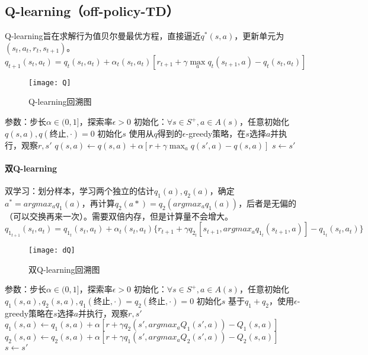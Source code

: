 \documentclass[
12pt, %
a4paper, 
oneside, %
headinclude,footinclude, %
]{scrartcl}
\begin{document}
\subsection[Q-learning]{Q-learning（off-policy-TD）}
Q-learning旨在求解行为值贝尔曼最优方程，直接逼近$ q^*(s, a) $，更新单元为$ (s_t, a_t, r_t, s_{t + 1}) $。
$$ q_{t + 1}(s_t, a_t) = q_t(s_t, a_t) + \alpha_t(s_t, a_t)[r_{t + 1} + \gamma \max_a q_t(s_{t + 1}, a) - q_t(s_t, a_t)] $$

\begin{figure}[H]
\centering
\texttt{[image: Q]}
\caption[Q-learning回溯图]{Q-learning回溯图}
\end{figure}
\begin{myalgorithm}
\State 参数：步长$ \alpha \in (0,1] $，探索率$ \epsilon > 0 $
\State 初始化：$ \forall s \in S^+, a \in A(s) $，任意初始化$ q(s,a), q(\text{终止}, \cdot) = 0 $
\State 初始化$ s $
\State 使用从$ q $得到的$ \epsilon $-greedy策略，在$ s $选择$ a $并执行，观察$ r, s' $
\State $ q(s, a) \gets q(s, a) + \alpha [r + \gamma \max_a q(s', a) - q(s, a)] $
\State $ s \gets s' $
\EndWhile
\EndFor
\end{myalgorithm}
\paragraph{双Q-learning}
双学习：划分样本，学习两个独立的估计$ q_1(a), q_2(a) $，确定$ a^* = argmax_a q_1(a) $，再计算$ q_2(a*) = q_2(argmax_a q_1(a)) $，后者是无偏的（可以交换再来一次）。需要双倍内存，但是计算量不会增大。
$$ q_{1_{t + 1}}(s_t, a_t) = q_{1_t}(s_t, a_t) + \alpha_t(s_t, a_t)\{r_{t + 1} + \gamma q_{2_t}[s_{t + 1}, argmax_a q_{1_t}(s_{t + 1}, a)] - q_{1_t}(s_t, a_t)\} $$

\begin{figure}[H]
\centering
\texttt{[image: dQ]}
\caption[双Q-learning回溯图]{双Q-learning回溯图}
\end{figure}
\begin{myalgorithm}[双Q-learning]
\State 参数：步长$ \alpha \in (0,1] $，探索率$ \epsilon > 0 $
\State 初始化：$ \forall s \in S^+, a \in A(s) $，任意初始化$ q_1(s,a), q_2(s,a), q_1(\text{终止}, \cdot) = q_2(\text{终止}, \cdot) = 0 $
\State 初始化$ s $
\State 基于$ q_1 + q_2 $，使用$ \epsilon $-greedy策略在$ s $选择$ a $并执行，观察$ r, s' $
\State $ q_1(s, a) \gets q_1(s, a) + \alpha [r + \gamma q_2(s', argmax_a Q_1(s',a)) - Q_1(s, a)] $
\Else
\State $ q_2(s, a) \gets q_2(s, a) + \alpha [r + \gamma q_1(s', argmax_a Q_2(s',a)) - Q_2(s, a)] $
\EndIf
\State $ s \gets s' $
\EndWhile
\EndFor
\end{myalgorithm}
\end{document}
